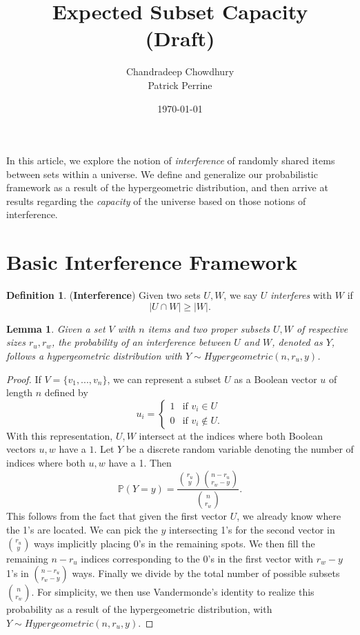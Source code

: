 \documentclass[10pt]{extarticle}
\title{\textbf{Expected Subset Capacity \\ (Draft)}}
\author{Chandradeep Chowdhury \\ Patrick Perrine}
\date{\today}
\newtheorem{lemma}[theorem]{Lemma}
\theoremstyle{definition}
\newtheorem{definition}[theorem]{Definition}
\begin{document}
 \maketitle
 
In this article, we explore the notion of \textit{interference} of randomly shared items between sets within a universe. We define and generalize our probabilistic framework as a result of the hypergeometric distribution, and then arrive at results regarding the \textit{capacity} of the universe based on those notions of interference.

\section{Basic Interference Framework}

\begin{definition}
    (\textbf{Interference}) Given two sets $U, W$, we say $U$ \textit{interferes} with $W$ if 
    \begin{equation}
        |U \cap W| \ge |W|.
    \end{equation}
\end{definition}

\begin{lemma}
	Given a set $V$ with $n$ items and two proper subsets $U,W$ of respective sizes $r_u,r_w$, the probability of an interference between $U$ and $W$, denoted as $Y$, follows a hypergeometric distribution with $Y \sim Hypergeometric(n, r_u, y)$.
\end{lemma}
\begin{proof}
	If $V = \{v_1,...,v_n\}$, we can represent a subset $U$ as a Boolean vector $u$ of length $n$ defined by
    $$
    u_i = \begin{cases}
        1 & \text{if } v_i \in U \\
        0 & \text{if } v_i \notin U.
    \end{cases}
    $$
    With this representation, $U,W$ intersect at the indices where both Boolean vectors $u, w$ have a $1$. Let $Y$ be a discrete random variable denoting the number of indices where both $u, w$ have a 1. Then 
    \begin{equation}
        \mathbb{P}(Y=y) = \frac{\binom{r_u}{y} \binom{n-r_u}{r_w-y}}{\binom{n}{r_w}}.
    \end{equation}
    This follows from the fact that given the first vector $U$, we already know where the 1's are located. We can pick the $y$ intersecting 1's for the second vector in $\binom{r_u}{y}$ ways implicitly placing 0's in the remaining spots. We then fill the remaining $n-r_u$ indices corresponding to the 0's in the first vector with $r_w-y$ 1's in $\binom{n-r_u}{r_w-y}$ ways. Finally we divide by the total number of possible subsets $\binom{n}{r_w}$. For simplicity, we then use Vandermonde's identity to realize this probability as a result of the hypergeometric distribution, with $Y \sim Hypergeometric(n, r_u, y)$.
\end{proof}
\end{document}
